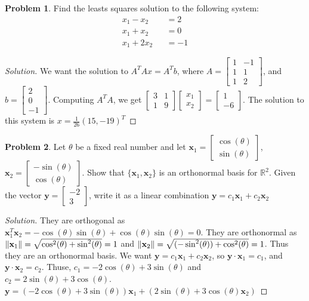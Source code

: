 \documentclass[oneside]{book}
\theoremstyle{definition}
\newtheorem{problem}{Problem}[section]
\newcommand*\B[1]{\mathbf{#1}}
\begin{document}
\begin{problem}
Find the leasts squares solution to the following system:
\begin{eqnarray}
\nonumber x_1 - x_2 &&=2\\
\nonumber x_1 + x_2 &&= 0\\
\nonumber x_1 + 2x_2 &&=-1
\end{eqnarray}
\end{problem}
\begin{proof}[Solution]
We want the solution to $A^T A x = A^T b$, where $A = \begin{bmatrix} 1 & -1 \\ 1 & 1 \\ 1 & 2 \end{bmatrix}$, and $b = \begin{bmatrix} 2\\0\\-1\end{bmatrix}$. Computing $A^T A$, we get $\begin{bmatrix} 3 & 1 \\ 1 & 9 \end{bmatrix} \begin{bmatrix} x_1 \\ x_2 \end{bmatrix} = \begin{bmatrix} 1 \\ -6 \end{bmatrix}$. The solution to this system is $x = \frac{1}{26}(15,-19)^T$
\end{proof}

\begin{problem}
Let $\theta$ be a fixed real number and let $\B{x}_1 = \begin{bmatrix} \cos(\theta) \\ \sin(\theta) \end{bmatrix}$, $\B{x}_2 = \begin{bmatrix} -\sin(\theta) \\ \cos(\theta) \end{bmatrix}$. Show that $\{\B{x}_1,\B{x}_2\}$ is an orthonormal basis for $\mathbb{R}^2$. Given the vector $\B{y} = \begin{bmatrix} -2 \\ 3 \end{bmatrix}$, write it as a linear combination $\B{y} = c_1 \B{x}_1+c_2\B{x}_2$
\end{problem}
\begin{proof}[Solution]
They are orthogonal as $\B{x}_1^T \B{x}_2 = -\cos(\theta)\sin(\theta) + \cos(\theta)\sin(\theta) = 0$. They are orthonormal as $\norm{\B{x}_1} = \sqrt{\cos^2(\theta)+\sin^2(\theta)} = 1$ and $\norm{\B{x}_2} = \sqrt{(-\sin^2(\theta))+\cos^2(\theta)}=1$. Thus they are an orthonormal basis. We want $\B{y} = c_1 \B{x}_1 + c_2 \B{x}_2$, so $\B{y} \cdot \B{x}_1 = c_1$, and $\B{y}\cdot \B{x}_2 = c_2$. Thuse, $c_1 = -2\cos(\theta)+3\sin(\theta)$ and $c_2 = 2\sin(\theta)+3\cos(\theta)$. \\ $\B{y} = (-2\cos(\theta)+3\sin(\theta))\B{x}_1 + (2\sin(\theta)+3\cos(\theta)\B{x}_2)$
\end{proof}
\end{document}

